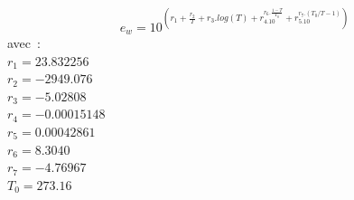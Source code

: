 $$
e_w = 10^{ \displaystyle \left(
          r_1 + \frac{r_2}{T} + r_3.log(T) + 
          r_4.10^{r_6.\frac{1-T}{T_0} } +
          r_5.10^{r_7.(T_0/T -1) } 
         \right) }
$$
avec~:\\
$r_1 = 23.832256 $ \\
$r_2 = -2949.076 $ \\
$r_3 = -5.02808 $ \\
$r_4 = -0.00015148$ \\
$r_5 = 0.00042861$ \\
$r_6 = 8.3040$ \\
$r_7 = -4.76967$ \\
$T_0 = 273.16$ \\
